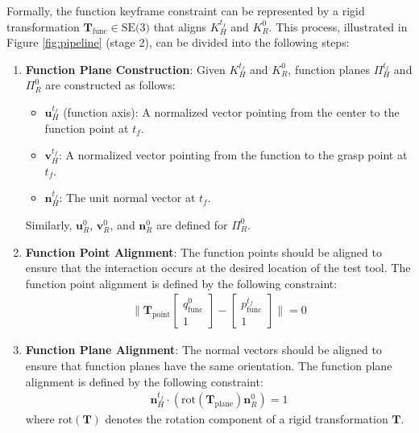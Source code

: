 Formally, the function keyframe constraint can be represented by a rigid transformation $\mathbf{T}_{\text{func}} \in \text{SE(3)}$ that aligns $K_H^{t_f}$ and $K_R^0$. This process, illustrated in Figure \ref{fig:pipeline} (stage 2), can be divided into the following steps:
\begin{enumerate}[label=\arabic*., start=0]
    \item \textbf{Function Plane Construction}: Given $K_H^{t_f}$ and $K_R^0$, function planes \( \Pi_H^{t_f} \) and \( \Pi_R^0 \) are constructed as follows:
\begin{itemize}
    \item \(\mathbf{u}_H^{t_f}\) (function axis): A normalized vector pointing from the center to the function point at $t_f$.
    \item \(\mathbf{v}_H^{t_f}\): A normalized vector pointing from the function to the grasp point at $t_f$.
    \item \(\mathbf{n}_H^{t_f}\): The unit normal vector at $t_f$.
\end{itemize}
Similarly, \(\mathbf{u}_R^0\), \(\mathbf{v}_R^0\), and \(\mathbf{n}_R^0\) are defined for \( \Pi_R^0 \). \\

    \item \textbf{Function Point Alignment}: The function points should be aligned to ensure that the interaction occurs at the desired location of the test tool. The function point alignment is defined by the following constraint:
    \begin{align*}
        \| \mathbf{T}_{\text{point}} \begin{bmatrix} q_{\text{func}}^0 \\ 1 \end{bmatrix} - \begin{bmatrix} p_{\text{func}}^{t_f} \\ 1 \end{bmatrix} \| = 0
    \end{align*}  

    \item \textbf{Function Plane Alignment}: The normal vectors should be aligned to ensure that function planes have the same orientation. The function plane alignment is defined by the following constraint:
    \begin{align*}                
    \mathbf{n}_H^{t_f} \cdot (\text{rot}(\mathbf{T}_{\text{plane}})\mathbf{n}_R^0) = 1
    \end{align*}
    where $\text{rot}(\mathbf{T})$ denotes the rotation component of a rigid transformation $\mathbf{T}$. \\
    

\end{enumerate}
